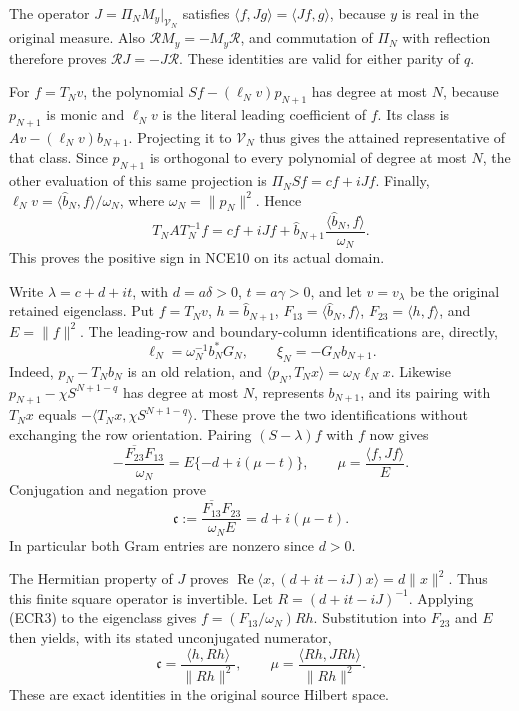 The operator \(J=\Pi_NM_y|_{\mathcal V_N}\) satisfies
\(\langle f,Jg\rangle=\langle Jf,g\rangle\), because \(y\) is real
in the original measure.  Also
\(\mathscr RM_y=-M_y\mathscr R\), and commutation of \(\Pi_N\)
with reflection therefore proves
\(\mathscr RJ=-J\mathscr R\).
These identities are valid for either parity of \(q\).

For \(f=T_Nv\), the polynomial
\(Sf-(\ell_Nv)p_{N+1}\) has degree at most \(N\), because \(p_{N+1}\)
is monic and \(\ell_Nv\) is the literal leading coefficient of \(f\).
Its class is \(Av-(\ell_Nv)b_{N+1}\).  Projecting it to
\(\mathcal V_N\) thus gives the attained representative of that
class.  Since \(p_{N+1}\) is orthogonal to every polynomial of degree
at most \(N\), the other evaluation of this same projection is
\(\Pi_NSf=cf+iJf\).  Finally,
\(\ell_Nv=\langle\widehat b_N,f\rangle/\omega_N\), where
\(\omega_N=\|p_N\|^2\).  Hence
\begin{equation}
 T_NAT_N^{-1}f
 =cf+iJf+
   \widehat b_{N+1}\frac{\langle\widehat b_N,f\rangle}{\omega_N}.
 \tag{ECR3}
\end{equation}
This proves the positive sign in NCE10 on its actual domain.

Write \(\lambda=c+d+it\), with \(d=a\delta>0\), \(t=a\gamma>0\),
and let \(v=v_\lambda\) be the original retained eigenclass.
Put \(f=T_Nv\), \(h=\widehat b_{N+1}\),
\(F_{13}=\langle\widehat b_N,f\rangle\),
\(F_{23}=\langle h,f\rangle\), and \(E=\|f\|^2\).
The leading-row and boundary-column identifications are, directly,
\[
 \ell_N=\omega_N^{-1}b_N^*G_N,\qquad \xi_N=-G_Nb_{N+1}.
\]
Indeed, \(p_N-T_Nb_N\) is an old relation, and
\(\langle p_N,T_Nx\rangle=\omega_N\ell_Nx\).
Likewise \(p_{N+1}-\chi S^{N+1-q}\) has degree at most \(N\),
represents \(b_{N+1}\), and its pairing with \(T_Nx\) equals
\(-\langle T_Nx,\chi S^{N+1-q}\rangle\).
These prove the two identifications without exchanging the row
orientation.  Pairing \((S-\lambda)f\) with \(f\) now gives
\[
 -\frac{\overline{F_{23}}F_{13}}{\omega_N}
   =E\{-d+i(\mu-t)\},\qquad
 \mu=\frac{\langle f,Jf\rangle}{E}.
\]
Conjugation and negation prove
\begin{equation}
 \mathfrak c:=\frac{\overline{F_{13}}F_{23}}{\omega_NE}
     =d+i(\mu-t).
 \tag{ECR4}
\end{equation}
In particular both Gram entries are nonzero since \(d>0\).

The Hermitian property of \(J\) proves
\(\operatorname{Re}\langle x,(d+it-iJ)x\rangle=d\|x\|^2\).
Thus this finite square operator is invertible.  Let
\(R=(d+it-iJ)^{-1}\).  Applying (ECR3) to the eigenclass gives
\(f=(F_{13}/\omega_N)Rh\).  Substitution into \(F_{23}\) and \(E\)
then yields, with its stated unconjugated numerator,
\begin{equation}
 \mathfrak c
  =\frac{\langle h,Rh\rangle}{\|Rh\|^2},\qquad
 \mu=\frac{\langle Rh,JRh\rangle}{\|Rh\|^2}.
 \tag{ECR5}
\end{equation}
These are exact identities in the original source Hilbert space.

